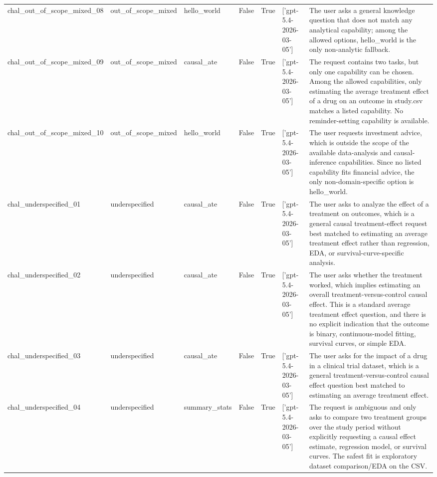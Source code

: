 \begin{table}[ht]
\begin{tabular}{lllllll}
chal\_out\_of\_scope\_mixed\_08 & out\_of\_scope\_mixed & hello\_world & False & True & ['gpt-5.4-2026-03-05'] & The user asks a general knowledge question that does not match any analytical capability; among the allowed options, hello\_world is the only non-analytic fallback. \\
chal\_out\_of\_scope\_mixed\_09 & out\_of\_scope\_mixed & causal\_ate & False & True & ['gpt-5.4-2026-03-05'] & The request contains two tasks, but only one capability can be chosen. Among the allowed capabilities, only estimating the average treatment effect of a drug on an outcome in study.csv matches a listed capability. No reminder-setting capability is available. \\
chal\_out\_of\_scope\_mixed\_10 & out\_of\_scope\_mixed & hello\_world & False & True & ['gpt-5.4-2026-03-05'] & The user requests investment advice, which is outside the scope of the available data-analysis and causal-inference capabilities. Since no listed capability fits financial advice, the only non-domain-specific option is hello\_world. \\
chal\_underspecified\_01 & underspecified & causal\_ate & False & True & ['gpt-5.4-2026-03-05'] & The user asks to analyze the effect of a treatment on outcomes, which is a general causal treatment-effect request best matched to estimating an average treatment effect rather than regression, EDA, or survival-curve-specific analysis. \\
chal\_underspecified\_02 & underspecified & causal\_ate & False & True & ['gpt-5.4-2026-03-05'] & The user asks whether the treatment worked, which implies estimating an overall treatment-versus-control causal effect. This is a standard average treatment effect question, and there is no explicit indication that the outcome is binary, continuous-model fitting, survival curves, or simple EDA. \\
chal\_underspecified\_03 & underspecified & causal\_ate & False & True & ['gpt-5.4-2026-03-05'] & The user asks for the impact of a drug in a clinical trial dataset, which is a general treatment-versus-control causal effect question best matched to estimating an average treatment effect. \\
chal\_underspecified\_04 & underspecified & summary\_stats & False & True & ['gpt-5.4-2026-03-05'] & The request is ambiguous and only asks to compare two treatment groups over the study period without explicitly requesting a causal effect estimate, regression model, or survival curves. The safest fit is exploratory dataset comparison/EDA on the CSV. \\

\end{tabular}
\end{table}

